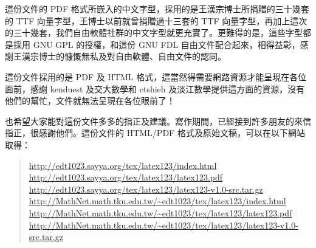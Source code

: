 這份文件的 PDF 格式所嵌入的中文字型，採用的是王漢宗博士所捐贈的三十幾套的 TTF 向量字型，王博士以前就曾捐贈過十三套的 TTF 向量字型，再加上這次的三十幾套，我們自由軟體社群的中文字型就更充實了。更難得的是，這些字型都是採用 GNU GPL 的授權，和這份 GNU FDL 自由文件配合起來，相得益彰，感謝王漢宗博士的慷慨無私及對自由軟體、自由文件的認同。

這份文件採用的是 PDF 及 HTML 格式，這當然得需要網路資源才能呈現在各位面前，感謝 kenduest 及交大數學和 ctshieh 及淡江數學提供這方面的資源，沒有他們的幫忙，文件就無法呈現在各位眼前了！

也希望大家能對這份文件多多的指正及建議。寫作期間，已經接到許多朋友的來信指正，很感謝他們。這份文件的 HTML/PDF 格式及原始文稿，可以在以下網站取得：

\begin{quote}
  \url{http://edt1023.sayya.org/tex/latex123/index.html} \\
  \url{http://edt1023.sayya.org/tex/latex123/latex123.pdf} \\
  \url{http://edt1023.sayya.org/tex/latex123/latex123-v1.0-src.tar.gz} \\
  \url{http://MathNet.math.tku.edu.tw/~edt1023/tex/latex123/index.html} \\
  \url{http://MathNet.math.tku.edu.tw/~edt1023/tex/latex123/latex123.pdf} \\
  \url{http://MathNet.math.tku.edu.tw/~edt1023/tex/latex123/latex123-v1.0-src.tar.gz}
\end{quote}
